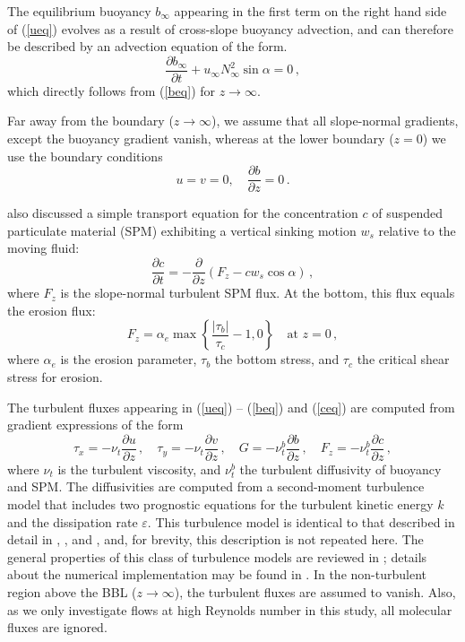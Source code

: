 The equilibrium buoyancy $b_\infty$ appearing in the first term on the
right hand side of (\ref{ueq}) evolves as a result of cross-slope
buoyancy advection, and can therefore be described by an advection
equation of the form.
\begin{equation}
  \label{binf}
  \frac{\partial b_\infty}{\partial t} + u_\infty N_\infty^2 \sin \alpha = 0 \, 
,
\end{equation}
which directly follows from (\ref{beq}) for $z \rightarrow \infty$.

Far away from the boundary ($z\rightarrow \infty$), we assume that all
slope-normal gradients, except the buoyancy gradient vanish, whereas at
the lower boundary ($z = 0$) we use the boundary conditions
\begin{equation}
  \label{uvbBC}
  u=v=0, \quad \frac{\partial b}{\partial z}=0 \, .
\end{equation}

\cite{schulzumlauf2016} also discussed a simple transport equation for
the concentration $c$ of suspended particulate material (SPM)
exhibiting a vertical sinking motion $w_s$ relative to the moving
fluid:
\begin{equation}
  \label{ceq}
  \frac{\partial c}{\partial t} = - \frac{\partial }{\partial z} \left( F_z - c 
w_s  \cos \alpha \right) \, , 
\end{equation}
where $F_z$ is the slope-normal turbulent SPM flux. At the bottom,
this flux equals the erosion flux:
\begin{equation}
  \label{Fz}
  F_z = \alpha_e \max \left\{ \frac{|\tau_b|}{\tau_c} -1,0 \right\} \quad 
\text{at $z=0$} \, ,
\end{equation}
where $\alpha_e$ is the erosion parameter, $\tau_b$ the bottom stress,
and $\tau_c$ the critical shear stress for erosion.

The turbulent fluxes appearing in (\ref{ueq}) -- (\ref{beq}) and
(\ref{ceq}) are computed from gradient expressions of the form
\begin{equation}
  \label{turbfluxes}
  \tau_x = - \nu_t   \frac{\partial u}{\partial z} \, , \quad
  \tau_y = - \nu_t   \frac{\partial v}{\partial z} \, , \quad
  G      = - \nu^b_t \frac{\partial b}{\partial z} \, , \quad
  F_z    = - \nu^b_t \frac{\partial c}{\partial z} \, , 
\end{equation}
where $\nu_t$ is the turbulent viscosity, and $\nu^b_t$ the turbulent
diffusivity of buoyancy and SPM. The diffusivities are computed from a
second-moment turbulence model that includes two prognostic equations
for the turbulent kinetic energy $k$ and the dissipation rate
$\varepsilon$. This turbulence model is identical to that described in
detail in \cite{UmlaufBurchard2011a}, \cite{Umlaufetal2015a}, and
\cite{schulzumlauf2016}, and, for brevity, this description is not
repeated here. The general properties of this class of turbulence
models are reviewed in \cite{UmlaufBurchard2005a}; details about the
numerical implementation may be found in \cite{Umlaufetal2005a}. In
the non-turbulent region above the BBL ($z \rightarrow \infty$), the
turbulent fluxes are assumed to vanish.  Also, as we only investigate
flows at high Reynolds number in this study, all molecular fluxes are
ignored.

